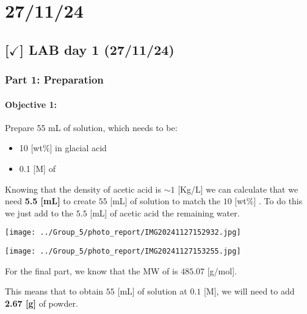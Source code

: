 \section{27/11/24}

\subsection{[$\checkmark$] LAB day 1 (27/11/24)}

\subsubsection{Part 1: Preparation}

\paragraph{Objective 1:} Prepare 55 mL of solution, which needs to be:
\begin{itemize}
    \item 10 [wt\%] in glacial acid
    \item 0.1 [M] of \ce{[Bi(NO_3)_3 5H_2O]}
\end{itemize}  

\noindent Knowing that the density of acetic acid is $\sim 1$ [Kg/L] we can calculate that we need \textbf{5.5 [mL]} to create $55$ [mL] of solution to match the $10$ [wt\%] . To do this we just add to the $5.5$ [mL] of acetic acid the remaining water.

\vspace{10pt}

\begin{minipage}{0.48\textwidth}
    \centering
    \texttt{[image: ../Group\_5/photo\_report/IMG20241127152932.jpg]}
\end{minipage}%
\begin{minipage}{0.48\textwidth}
    \centering
    \texttt{[image: ../Group\_5/photo\_report/IMG20241127153255.jpg]}
\end{minipage}

\vspace{10pt}

\noindent For the final part, we know that the MW of \ce{[Bi(NO_3)_3 5H_2O]} is $485.07$ [g/mol]. 

\noindent This means that to obtain $55$ [mL] of solution at $0.1$ [M], we will need to add \textbf{2.67 [g]} of powder.

